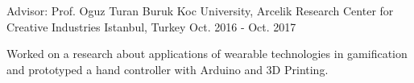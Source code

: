 \begin{cventries}
  \cventry
    {Advisor: Prof. Oguz Turan Buruk} %
    {Koc University, Arcelik Research Center for Creative Industries} %
    {Istanbul, Turkey} %
    {Oct. 2016 - Oct. 2017} %
    {
      \begin{cvitems} %
         \item {Worked on a research about applications  of wearable technologies in gamification and prototyped a hand controller with Arduino and 3D Printing.}
      \end{cvitems}
    }

\end{cventries}
